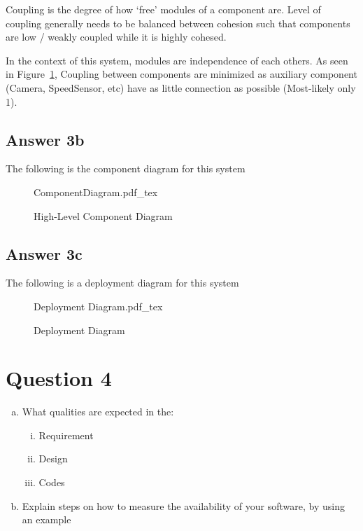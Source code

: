 \documentclass[
  11pt, %
]{assignment}
\begin{document}
Coupling is the degree of how `free' modules of a component are. Level of coupling generally needs to be balanced between cohesion such that components are low / weakly coupled while it is highly cohesed.

In the context of this system, modules are independence of each others. As seen in Figure~\ref{fig:component}, Coupling between components are minimized as auxiliary component (Camera, SpeedSensor, etc) have as little connection as possible (Most-likely only 1).

\subsection*{Answer 3b}

The following is the component diagram for this system

\begin{figure}[h]
  \centering
  \def\svgwidth{\columnwidth}
  \fontsize{6}{15}\selectfont
  {ComponentDiagram.pdf_tex}
  \caption{High-Level Component Diagram}
  \label{fig:component}
\end{figure}

\pagebreak

\subsection*{Answer 3c}

The following is a deployment diagram for this system

\begin{figure}[h]
  \centering
  \def\svgwidth{\columnwidth}
  \fontsize{9}{15}\selectfont
  {Deployment Diagram.pdf_tex}
  \caption{Deployment Diagram}
\end{figure}


\section*{Question 4}
\begin{problem}
\begin{enumerate}[a.]
  \item What qualities are expected in the:
        \begin{enumerate}[i.]
          \item Requirement
          \item Design
          \item Codes
        \end{enumerate}
  \item Explain steps on how to measure the availability of your software, by using an example
\end{enumerate}
\end{problem}
\end{document}
